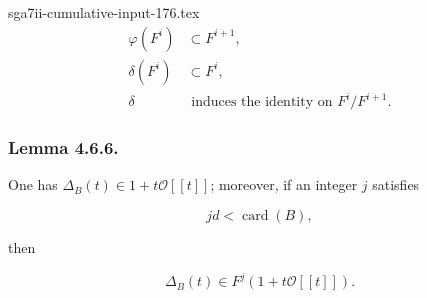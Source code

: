 \begin{filecontents*}{sga7ii-cumulative-input-176.tex}
\begin{align}
\varphi(F^i)&\subset F^{i+1}, \tag{4.6.3}\\
\delta(F^i)&\subset F^i, \tag{4.6.4}\\
\delta&\text{ induces the identity on }F^i/F^{i+1}. \tag{4.6.5}
\end{align}

\subsubsection*{Lemma 4.6.6.}
One has $\Delta_B(t)\in1+t\mathcal O[[t]]$; moreover, if an integer $j$
satisfies

\begin{equation}\tag{4.6.7}
jd<\operatorname{card}(B),
\end{equation}

then

\begin{equation}\tag{4.6.8}
\Delta_B(t)\in F^j(1+t\mathcal O[[t]]).
\end{equation}

\end{filecontents*}
